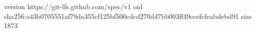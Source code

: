 version https://git-lfs.github.com/spec/v1
oid sha256:a43b0705551af79da355cf125bf500cdcd270d47bb003ff49ccefcfeabdebd91
size 1873
